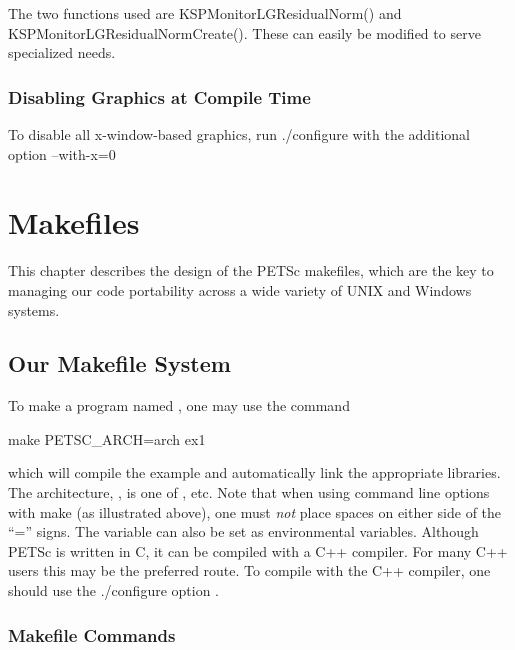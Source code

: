 {{The two functions used are KSPMonitorLGResidualNorm()
and KSPMonitorLGResidualNormCreate(). These
can easily be modified to serve specialized needs.


\subsection{Disabling Graphics at Compile Time}

To disable all x-window-based graphics, run ./configure with the
additional option --with-x=0


\cleardoublepage
\chapter{Makefiles}
\label{ch_makefiles}

This chapter describes the design of the PETSc makefiles, which are the
key to managing our code portability across a wide variety of UNIX and Windows systems.

\section{Our Makefile System}

To make a program named , one may use the command
\begin{tabbing}
   make PETSC\_ARCH=arch  ex1
\end{tabbing}
which will compile the
example and automatically link the appropriate libraries.  The
architecture, , is one of , etc. Note
that when using command line options with make (as illustrated above),
one must {\em not} place spaces on either side of the ``='' signs.
The variable
 can also be set as environmental
variables.  Although PETSc is written in C, it can be compiled with a
C++ compiler.  For many C++ users this may be the preferred route. To compile
with the C++ compiler, one should use the ./configure option . 

\subsection{Makefile Commands} \label{sec_common}

}}
